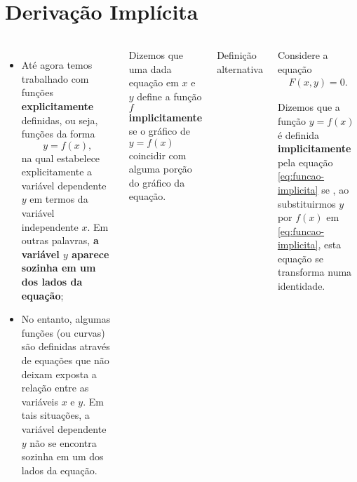\section{Derivação Implícita}

\begin{frame}
  \begin{columns}[onlytextwidth]
    \vspace*{-0.5cm}\small
      \begin{itemize}\justifying
        \item Até agora temos trabalhado com funções \mbox{\textbf{explicitamente}} definidas, ou seja, funções da forma
        \begin{equation*}
          y = f(x),
        \end{equation*}
        na qual estabelece explicitamente a variável dependente $y$ em termos da variável independente $x$. Em outras palavras, \textbf{a variável $y$ aparece sozinha em um dos lados da equação};
        \item No entanto, algumas funções (ou curvas) são definidas através de equações que não deixam exposta a relação entre as variáveis $x$ e $y$. Em tais situações, { a variável dependente $y$ não se encontra sozinha em um dos lados da equação.}
      \end{itemize}
    \hfill
    \vspace*{-0.5cm}
      \begin{definition}\justifying
        Dizemos que uma dada equação em $x$ e $y$ define a função $f$ \textbf{implicitamente} se o \mbox{gráfico} de $y=f(x)$ coincidir com alguma porção do gráfico da equação.
      \end{definition}

      Definição alternativa\\

      \begin{definition}\justifying
          Considere a equação
          \begin{align}\label{eq:funcao-implicita}
            F(x,y)=0.
          \end{align}
          
          Dizemos que a função $y=f(x)$ é \mbox{definida} \textbf{implicitamente} pela equação \eqref{eq:funcao-implicita} se , ao substituirmos $y$ por $f(x)$ em \eqref{eq:funcao-implicita}, esta \mbox{equação} se transforma numa identidade.
      \end{definition}
  \end{columns}
\end{frame}


